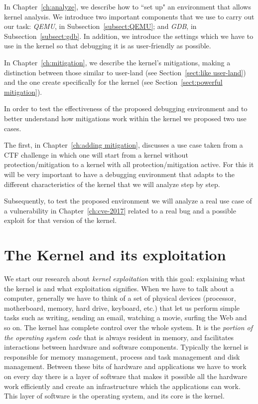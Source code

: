 \documentclass{masterthesis}
\newcommand{\refToChapter}[1]{Chapter~\ref{ch:#1}\xspace}
\newcommand{\refToSection}[1]{Section~\ref{sect:#1}\xspace}
\newcommand{\refToSubSection}[1]{Subsection~\ref{subsect:#1}\xspace}
\begin{document}
In \refToChapter{analyze}, we describe how to ``set up" an environment that allows kernel analysis.
We introduce two important components that we use to carry out our task: \emph{QEMU}, in \refToSubSection{QEMU}; and \emph{GDB}, in \refToSubSection{gdb}.
In addition, we introduce the settings which we have to use in the kernel so that debugging it is as user-friendly as possible.

In \refToChapter{mitigation}, we describe the kernel’s mitigations, making a distinction between those similar to user-land (see \refToSection{like user-land}) and the one create specifically for the kernel (see \refToSection{powerful mitigation}).

In order to test the effectiveness of the proposed debugging environment and to better understand how mitigations work within the kernel we proposed two use cases.

The first, in \refToChapter{adding mitigation}, discusses a use case taken from a CTF challenge in which one will start from a kernel without protection/mitigation to a kernel with all protection/mitigation active. For this it will be very important to have a debugging environment that adapts to the different characteristics of the kernel that we will analyze step by step.

Subsequently, to test the proposed environment we will analyze a real use case of a vulnerability in \refToChapter{cve-2017} related to a real bug and a possible exploit for that version of the kernel.


\chapter{The Kernel and its exploitation}
\label{ch:kernel}

We start our research about \emph{kernel exploitation} with this goal: explaining what the kernel is and what exploitation signifies.
When we have to talk about a computer, generally we have to think of a set of physical devices (processor, motherboard, memory, hard drive, keyboard, etc.) that let us perform simple tasks such as writing, sending an email, watching a movie, surfing the Web and so on.
The kernel has complete control over the whole system. It is the \emph{portion of the operating system code} that is always resident in memory, and facilitates interactions between hardware and software components.
Typically the kernel is responsible for memory management, process and task management and disk management.
Between these bits of hardware and applications we have to work on every day there is a layer of software that makes it possible all the hardware work efficiently and create an infrastructure which the applications can work.
This layer of software is the operating system, and its core is the kernel.
\end{document}
